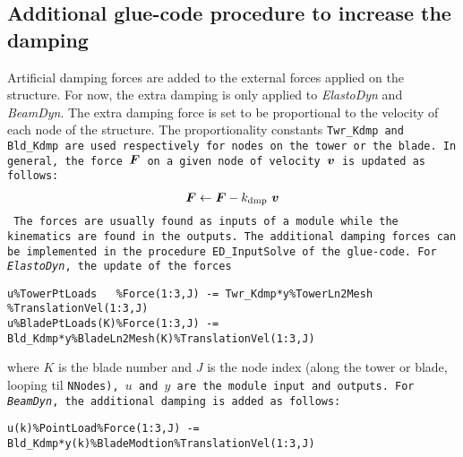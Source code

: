 \documentclass[11pt]{article}
\begin{document}
% 
% 
% 
% 
% 
% 






\subsection{Additional glue-code procedure to increase the damping}


\label{sec:damping}
Artificial damping forces are added to the external forces applied on the structure.
For now, the extra damping is only applied to \textit{ElastoDyn} and \textit{BeamDyn}.
% 
The extra damping force is set to be proportional to the velocity of each node of the structure. The proportionality constants \tt{Twr\_Kdmp} and \tt{Bld\_Kdmp} are used respectively for nodes on the tower or the blade. 
% 
In general, the force $\boldsymbol{F}$ on a given node of velocity $\boldsymbol{v}$ is updated as follows:
\begin{align}
    \boldsymbol{F} \leftarrow  \boldsymbol{F}  -  k_\text{dmp}\  \boldsymbol{v}
\end{align}
The forces are usually found as inputs of a module while the kinematics are found in the outputs. 
% 
The additional damping forces can be implemented in the procedure \tt{ED\_InputSolve} of the glue-code.
For \textit{ElastoDyn}, the update of the forces 
\begin{lstlisting}
u%TowerPtLoads   %Force(1:3,J) -= Twr_Kdmp*y%TowerLn2Mesh   %TranslationVel(1:3,J)
u%BladePtLoads(K)%Force(1:3,J) -= Bld_Kdmp*y%BladeLn2Mesh(K)%TranslationVel(1:3,J)
\end{lstlisting}
where $K$ is the blade number and $J$ is the node index (along the tower or blade, looping til \tt{NNodes}), $u$ and $y$ are the module input and outputs.
For \textit{BeamDyn}, the additional damping is added as follows:
\begin{lstlisting}
u(k)%PointLoad%Force(1:3,J) -= Bld_Kdmp*y(k)%BladeModtion%TranslationVel(1:3,J)
\end{lstlisting}
\end{document}

